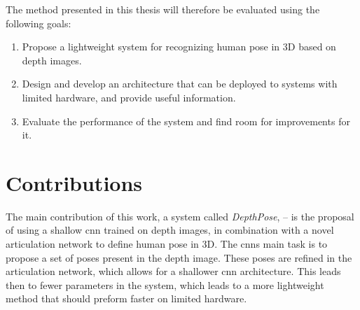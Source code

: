 The method presented in this thesis will therefore be evaluated using the following goals:



\begin{enumerate}
\item Propose a lightweight system for recognizing human pose in 3D based on depth images. 
\item Design and develop an architecture that can be deployed to systems with limited hardware, and provide useful information.
\item Evaluate the performance of the system and find room for improvements for it.
\end{enumerate}

\section{Contributions}

The main contribution of this work, a system called \emph{DepthPose}, -- is the proposal of using a shallow \gls{cnn} trained on depth images, in combination with a novel articulation network to define human pose in 3D. The \gls{cnn}s main task is to propose a set of poses present in the depth image. These poses are refined in the articulation network, which allows for a shallower \gls{cnn} architecture. This leads then to fewer parameters in the system, which leads to a more lightweight method that should preform faster on limited hardware.



